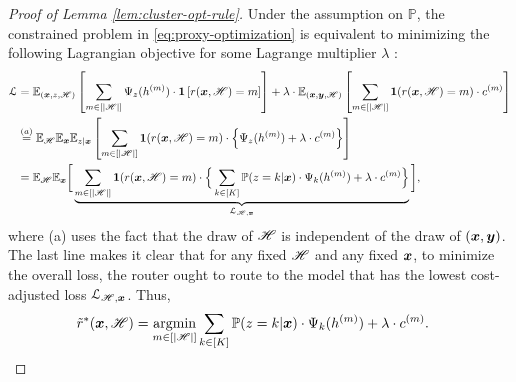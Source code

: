 \begin{proof}[Proof of Lemma \ref{lem:cluster-opt-rule}]
Under the assumption on $\mathbb{P}$, the constrained problem in \eqref{eq:proxy-optimization}
is equivalent to minimizing the following Lagrangian objective for
some Lagrange multiplier $\lambda$ \citep{neyman1933ix}:
\begin{align*}
\mathcal{L} & =\mathbb{E}_{(\bx,z,\mset)}\left[\sum_{m \in [|\mathscr{H}|]}\LLMEmbedScalar_{z}(h^{(m)}) \cdot\1\left[r(\bx, \mset)=m\right]\right]+\lambda\cdot\mathbb{E}_{(\bx,\by,\mathscr{H})}\left[\sum_{m\in[|\mathscr{H}|]}\1(r(\bx,\mset)=m)\cdot c^{(m)}\right]\\
 & \stackrel{(a)}{=}\mathbb{E}_{\mset}\mathbb{E}_{\bx}\mathbb{E}_{z|\bx}\left[\sum_{m\in[|\mathscr{H}|]}\1(r(\bx, \mset)=m)\cdot\left\{ \LLMEmbedScalar_{z}(h^{(m)}) +\lambda\cdot c^{(m)}\right\} %
 \right]\\
 & =\mathbb{E}_{\mset}\mathbb{E}_{\bx}\bigg[
 \underbrace{
 \sum_{m\in[|\mathscr{H}|]}\1(r(\bx,\mset)=m)\cdot\Big\{ 
 \sum_{k\in[K]}\mathbb{P}(z=k|\bx) \cdot  \LLMEmbedScalar_{k}(h^{(m)}) 
 +\lambda\cdot c^{(m)}\Big\}
 }_{\mathcal{L}_{\mset,\bx}}
 \bigg],
\end{align*}
where (a) uses the fact that the draw of $\mathscr{H}$ is independent of the draw of $(\boldsymbol{x},\boldsymbol{y})$. 
The last line makes it clear that for any fixed $\mathscr{H}$ %
and any fixed $\boldsymbol{x}$, to minimize the overall loss, the router ought to
route to the model that has the lowest cost-adjusted loss $\mathcal{L}_{\mathscr{H},\boldsymbol{x}}$. Thus, 
\begin{align*}
\tilde{r}^{*}(\boldsymbol{x},\mathscr{H}) 
 & =\underset{m\in[|\mathscr{H}|]}{\operatorname{argmin}}\sum_{k\in[K]}\mathbb{P}(z=k|\boldsymbol{x}) \cdot \Psi_{k}(h^{(m)}) +\lambda \cdot c^{(m)}.
\end{align*}
\end{proof}

